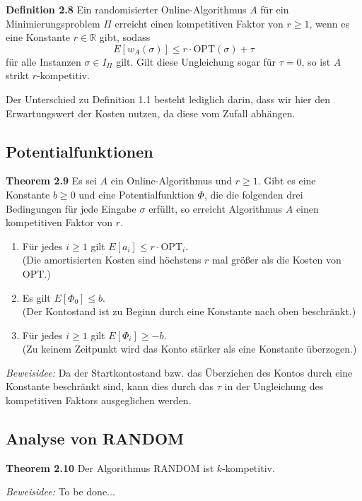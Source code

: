\textbf{Definition 2.8} Ein randomisierter Online-Algorithmus $A$ für ein Minimierungsproblem $\Pi$ erreicht einen kompetitiven Faktor von $r \ge 1$, wenn es eine Konstante $r \in \mathbb{R}$ gibt, sodass
$$E[w_A(\sigma)] \leq r \cdot \textrm{OPT}(\sigma) + \tau$$
für alle Instanzen $\sigma \in I_\Pi$ gilt. Gilt diese Ungleichung sogar für $\tau = 0$, so ist $A$ strikt $r$-kompetitiv.

Der Unterschied zu Definition 1.1 besteht lediglich darin, dass wir hier den Erwartungswert der Kosten nutzen, da diese vom Zufall abhängen.

\subsection{Potentialfunktionen}

\textbf{Theorem 2.9} Es sei $A$ ein Online-Algorithmus und $r \geq 1$. Gibt es eine Konstante $b \geq 0$ und eine Potentialfunktion $\Phi$, die die folgenden drei Bedingungen für jede Eingabe $\sigma$ erfüllt, so erreicht Algorithmus $A$ einen kompetitiven Faktor von $r$.
\begin{enumerate}
\item Für jedes $i \geq 1$ gilt $E[a_i] \leq r \cdot \textrm{OPT}_i$.\\
(Die amortisierten Kosten sind höchstens $r$ mal größer als die Kosten von OPT.)
\item Es gilt $E[\Phi_0] \leq b$.\\
(Der Kontostand ist zu Beginn durch eine Konstante nach oben beschränkt.)
\item Für jedes $i \geq 1$ gilt $E[\Phi_i] \geq -b$.\\
(Zu keinem Zeitpunkt wird das Konto stärker als eine Konstante überzogen.)
\end{enumerate}

\textit{Beweisidee:} Da der Startkontostand bzw. das Überziehen des Kontos durch eine Konstante beschränkt sind, kann dies durch das $\tau$ in der Ungleichung des kompetitiven Faktors ausgeglichen werden.


\subsection{Analyse von RANDOM}


\textbf{Theorem 2.10} Der Algorithmus RANDOM ist $k$-kompetitiv.

\textit{Beweisidee:} To be done...




